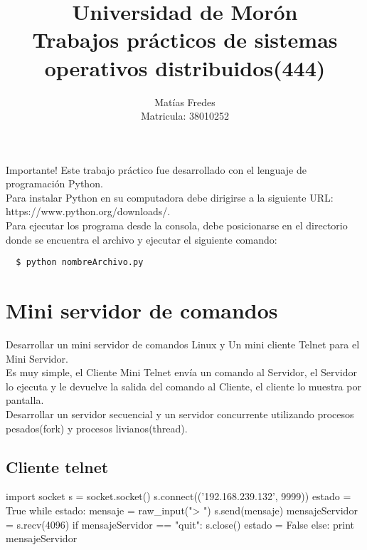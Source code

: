 \documentclass[12pt,a4paper,titlepage]{article}
\title{Universidad de Mor\'on\\ Trabajos pr\'acticos de sistemas operativos distribuidos(444)}
\author{Mat\'ias Fredes \\Matricula: 38010252}
\begin{document}
    \maketitle
    \newpage
    \begin{bclogo}[logo=\bcattention, couleurBarre=red, noborder=true, 
               couleur=LightSalmon]{Importante!}
    Este trabajo pr\'actico fue desarrollado con el lenguaje de programaci\'on Python.\\
    Para instalar Python en su computadora debe dirigirse a la siguiente URL: https://www.python.org/downloads/.\\
    Para ejecutar los programa desde la consola, debe posicionarse en el directorio donde se encuentra el archivo y ejecutar el siguiente comando:\begin{verbatim}
  $ python nombreArchivo.py
    \end{verbatim}
\end{bclogo}
    \section{Mini servidor de comandos}
    
  
    
    
    \noindent Desarrollar un mini servidor de comandos Linux y Un mini cliente Telnet para el Mini Servidor.\\
    Es muy simple, el Cliente Mini Telnet envía un comando al Servidor, el Servidor lo ejecuta y le devuelve la salida del comando al Cliente, el cliente lo muestra por pantalla.\\
    Desarrollar un servidor secuencial y un servidor concurrente utilizando procesos pesados(fork) y procesos livianos(thread).
    \subsection{Cliente telnet}
    \begin{python}
    import socket
    s = socket.socket()
    s.connect(('192.168.239.132', 9999))
    estado = True
    while estado:
        mensaje = raw_input("> ")
        s.send(mensaje)
        mensajeServidor = s.recv(4096)
        if mensajeServidor == "quit":
    	    s.close()
    	    estado = False
        else:
            print mensajeServidor
    \end{python}
\end{document}
